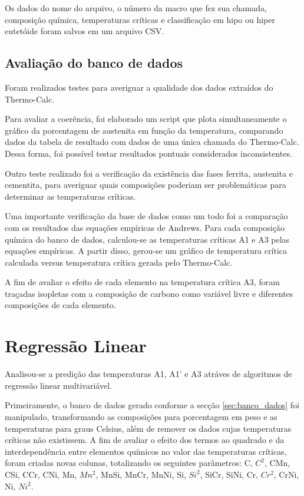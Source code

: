 \documentclass[brazil,tf,epusp]{usp}  %
\begin{document}
Os dados do nome do arquivo, o número da macro que fez sua chamada, composição química, temperaturas críticas e classificação em hipo ou hiper eutetóide foram salvos em um arquivo CSV.

\subsection{Avaliação do banco de dados}

Foram realizados testes para averiguar a qualidade dos dados extraídos do Thermo-Calc\textregistered{}.

Para avaliar a coerência, foi elaborado um script que plota simultaneamente o gráfico da porcentagem de austenita em função da temperatura, comparando dados da tabela de resultado com dados de uma única chamada do Thermo-Calc\textregistered{}. Dessa forma, foi possível testar resultados pontuais considerados inconsistentes.

Outro teste realizado foi a verificação da existência das fases ferrita, austenita e cementita, para averiguar quais composições poderiam ser problemáticas para determinar as temperaturas críticas.

Uma importante verificação da base de dados como um todo foi a comparação com os resultados das equações empíricas de Andrews. Para cada composição química do banco de dados, calculou-se as temperaturas críticas A1 e A3 pelas equações empíricas. A partir disso, gerou-se um gráfico de temperatura crítica calculada versus temperatura crítica gerada pelo Thermo-Calc\textregistered{}.

A fim de avaliar o efeito de cada elemento na temperatura crítica A3, foram traçadas isopletas com a composição de carbono como variável livre e diferentes composições de cada elemento.

\section{Regressão Linear}
\label{sec:metodo_RL}

Analisou-se a predição das temperaturas A1, A1' e A3 atráves de algoritmos de regressão linear multivariável.

Primeiramente, o banco de dados gerado conforme a secção \ref{sec:banco_dados} foi manipulado, transformando as composições para porcentagem em peso e as temperaturas para graus Celsius, além de remover os dados cujas temperaturas críticas não existissem. A fim de avaliar o efeito dos termos ao quadrado e da interdependência entre elementos químicos no valor das temperaturas críticas, foram criadas novas colunas, totalizando os seguintes parâmetros: C, $C^{2}$, CMn, CSi, CCr, CNi, Mn, $Mn^{2}$, MnSi, MnCr, MnNi, Si, $Si^{2}$, SiCr, SiNi, Cr, $Cr^{2}$, CrNi, Ni, $Ni^{2}$.
\end{document}
